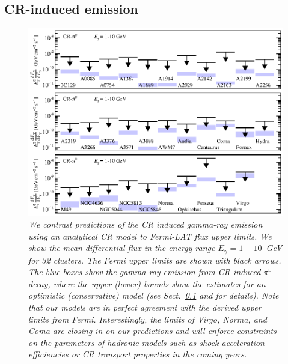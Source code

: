 \documentclass[10pt,aps,pra,reprint,amsmath,amsfonts,amssymb,showpacs,nofootinbib,floatfix]{revtex4-1}
\begin{document}
\subsection{CR-induced emission}
\label{sec:CRemission} 
\begin{figure}
\begin{minipage}{2.0\columnwidth}
  \includegraphics[width=0.99\columnwidth]{figures/Fermi.comp.CR.diff.eps}
  \caption{\it We contrast predictions of the CR induced gamma-ray
    emission using an analytical CR model \protect
    \cite{2010MNRAS.409..449P} to Fermi-LAT flux upper limits. We show
    the mean differential flux in the energy range $E_\gamma=1-10$~GeV
    for 32 clusters. The Fermi upper limits are shown with black
    arrows. The blue boxes show the gamma-ray emission from CR-induced
    $\pi^0$-decay, where the upper (lower) bounds show the estimates
    for an optimistic (conservative) model (see
    Sect.~\ref{sec:CRemission} and \cite{2010MNRAS.409..449P} for
    details). Note that our models are in perfect agreement with the
    derived upper limits from Fermi. Interestingly, the limits of
    Virgo, Norma, and Coma are closing in on our predictions and will
    enforce constraints on the parameters of hadronic models such as
    shock acceleration efficiencies or CR transport properties in the
    coming years.}
 \label{fig15}
\end{minipage}
\end{figure}
\end{document}
